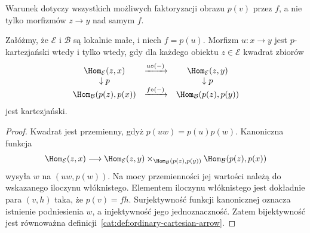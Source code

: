 \begin{center}
\end{center}

Warunek dotyczy wszystkich możliwych faktoryzacji obrazu $p(v)$ przez $f$, a nie tylko morfizmów $z\to y$ nad samym $f$.

\begin{stwierdzenie}\label{cat:prop:cartesian-hom-pullback}
Załóżmy, że $\mathcal E$ i $\mathcal B$ są lokalnie małe, i niech $f=p(u)$. Morfizm $u:x\to y$ jest $p$-kartezjański wtedy i tylko wtedy, gdy dla każdego obiektu $z\in\mathcal E$ kwadrat zbiorów
\[
\begin{array}{ccc}
 \Hom_{\mathcal E}(z,x)&\xrightarrow{u\circ(-)}&\Hom_{\mathcal E}(z,y)\\
 \downarrow p&&\downarrow p\\
 \Hom_{\mathcal B}(p(z),p(x))&\xrightarrow{f\circ(-)}&
 \Hom_{\mathcal B}(p(z),p(y))
\end{array}
\]
jest kartezjański.
\end{stwierdzenie}
\begin{proof}
Kwadrat jest przemienny, gdyż $p(uw)=p(u)p(w)$. Kanoniczna funkcja
\[
 \Hom_{\mathcal E}(z,x)\longrightarrow
 \Hom_{\mathcal E}(z,y)
 \times_{\Hom_{\mathcal B}(p(z),p(y))}
 \Hom_{\mathcal B}(p(z),p(x))
\]
wysyła $w$ na $(uw,p(w))$. Na mocy przemienności jej wartości należą do wskazanego iloczynu włóknistego. Elementem iloczynu włóknistego jest dokładnie para $(v,h)$ taka, że $p(v)=fh$. Surjektywność funkcji kanonicznej oznacza istnienie podniesienia $w$, a injektywność jego jednoznaczność. Zatem bijektywność jest równoważna definicji~\ref{cat:def:ordinary-cartesian-arrow}.
\end{proof}

